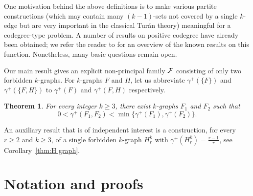 \documentclass[11pt]{article}
\newcommand{\C}[1]{{\protect\cal #1}}
\newtheorem{theorem}{Theorem}
\newcommand{\hide}[1]{}
\begin{document}
One motivation behind the above definitions is to make various partite constructions (which may contain many $(k-1)$-sets not covered by a single $k$-edge but are very important in the classical Tur\'an theory) meaningful for a codegree-type problem. A number of results  on positive codegree have already been obtained; we refer the reader to \cite{BaloghHalfpapLidickyPalmer26} for an overview of the known results on this function. 
Nonetheless, many basic questions remain open.

Our main result gives an explicit non-principal family $\C F$ consisting of only two forbidden $k$-graphs. For $k$-graphs $F$ and $H$, let us abbreviate $\gamma^+(\{F\})$ and $\gamma^+(\{F,H\})$ to $\gamma^+(F)$ and $\gamma^+(F,H)$ respectively.


\begin{theorem}\label{thm:non-principal}
  For every integer $k \geq 3$, there exist $k$-graphs $F_1$ and $F_2$ such that
  \[
  0 < \gamma^+(F_1, F_2) < \min\{\gamma^+(F_1), \gamma^+(F_2)\}.
  \]
\end{theorem}

An auxiliary result that is of independent interest is a construction, for every $r\ge2$ and $k
\ge 3$, of a single forbidden $k$-graph $H_r^k$ with $\gamma^+(H_r^k)=\frac{r-1}r$, see Corollary~\ref{thm:H graph}.

\hide{
\noindent\textbf{Proof Sketch:} For any integer $k \ge 3$, our goal is to construct two graphs $F_1$ and $F_2$ such that 
$0<\gamma^+(F_1, F_2) < \min\{\gamma^+(F_1), \gamma^+(F_2)\}$. 
To construct $F_1$, we first show there exists a sequence of graphs $H_r^k$ such that 
$\gamma^+(H_r^k) = \frac{r-1}{r}$. Since $H_2^k$ is not sufficient for our main result, we define $F_1 \coloneqq Q_2^k$ using $H_2^{k-1}$. This construction ensures that $\gamma^+(F_1) = \frac{1}{2}$.
For $F_2$, we take a large clique and add all pairs to a common $(k-2)$-set, 
which ensures $\gamma^+(F_2) \ge \frac{1}{2}$. Finally, we prove that $\gamma^+(F_1, F_2) < \frac{1}{2}$ by utilizing the 
specific structures of $F_1$ and $F_2$.
}

\section{Notation and proofs}
\end{document}

